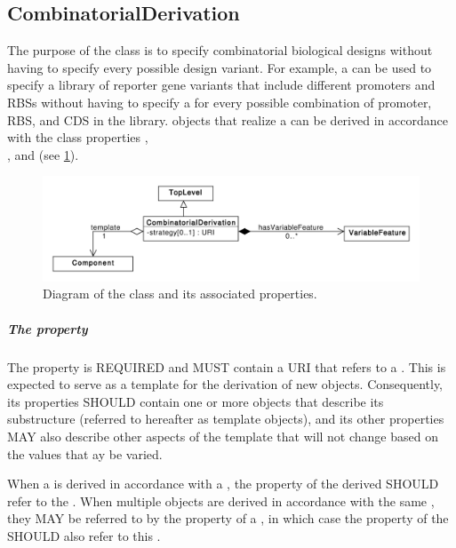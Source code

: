 \subsection{CombinatorialDerivation}
\label{sec:CombinatorialDerivation}

The purpose of the  class is to specify combinatorial biological designs without having to specify every possible design variant. For example, a  can be used to specify a library of reporter gene variants that include different promoters and RBSs without having to specify a  for every possible combination of promoter, RBS, and CDS in the library.  objects that realize a  can be derived in accordance with the class properties , \\
, and  (see \ref{uml:combinatorial_derivation}).

\begin{figure}[ht]
\begin{center}
\includegraphics[scale=0.6]{uml/combinatorial_derivation}
\caption[]{Diagram of the  class and its associated properties.}
\label{uml:combinatorial_derivation}
\end{center}
\end{figure}

\subparagraph{The  property}\label{sec:template}

The  property is REQUIRED and MUST contain a URI that refers to a . 
This  is expected to serve as a template for the derivation of new  objects. 
Consequently, its  properties SHOULD contain one or more  objects that describe its substructure (referred to hereafter as template  objects), and its other properties MAY also describe other aspects of the template that will not change based on the values that ay be varied.

When a  is derived in accordance with a , the  property of the derived  SHOULD refer to the . When multiple  objects are derived in accordance with the same , they MAY be referred to by the  property of a , in which case the  property of the  SHOULD also refer to this .


